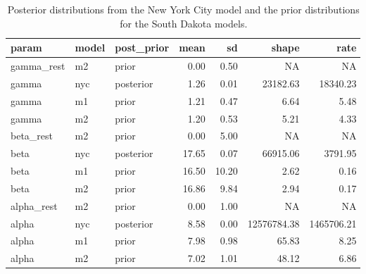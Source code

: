 \documentclass[
]{article}
\begin{document}
\begin{table}[!h]

\caption{\label{tab:unnamed-chunk-1}Posterior distributions from the New York City model and the prior distributions for the South Dakota models.}
\centering
\begin{tabular}[t]{lllrrrr}
\toprule
param & model & post\_prior & mean & sd & shape & rate\\
\midrule
\rowcolor{gray!6}  gamma\_rest & m2 & prior & 0.00 & 0.50 & NA & NA\\
gamma & nyc & posterior & 1.26 & 0.01 & 23182.63 & 18340.23\\
\rowcolor{gray!6}  gamma & m1 & prior & 1.21 & 0.47 & 6.64 & 5.48\\
gamma & m2 & prior & 1.20 & 0.53 & 5.21 & 4.33\\
\rowcolor{gray!6}  beta\_rest & m2 & prior & 0.00 & 5.00 & NA & NA\\
\addlinespace
beta & nyc & posterior & 17.65 & 0.07 & 66915.06 & 3791.95\\
\rowcolor{gray!6}  beta & m1 & prior & 16.50 & 10.20 & 2.62 & 0.16\\
beta & m2 & prior & 16.86 & 9.84 & 2.94 & 0.17\\
\rowcolor{gray!6}  alpha\_rest & m2 & prior & 0.00 & 1.00 & NA & NA\\
alpha & nyc & posterior & 8.58 & 0.00 & 12576784.38 & 1465706.21\\
\addlinespace
\rowcolor{gray!6}  alpha & m1 & prior & 7.98 & 0.98 & 65.83 & 8.25\\
alpha & m2 & prior & 7.02 & 1.01 & 48.12 & 6.86\\
\bottomrule
\end{tabular}
\end{table}
\end{document}
